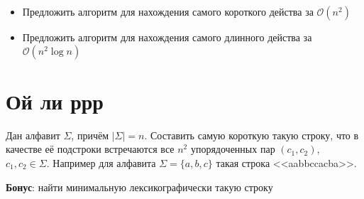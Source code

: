 \documentclass[addpoints]{exam}
\begin{document}
\begin{itemize}
\item Предложить алгоритм для нахождения самого короткого действа за $\mathcal{O}(n^2)$
\item Предложить алгоритм для нахождения самого длинного действа за $\mathcal{O}(n^2 \log{n})$
\end{itemize}

\section{Ой ли ррр}

Дан алфавит $\Sigma$, причём $|\Sigma| = n$. Составить самую короткую такую строку, что в качестве её подстроки встречаются все $n^2$ упорядоченных пар $(c_1, c_2)$, $c_1, c_2 \in \Sigma$. Например для алфавита $\Sigma = \{a,b,c\}$ такая строка <<aabbccacba>>.

\textbf{Бонус}: найти минимальную лексикографически такую строку
\end{document}
